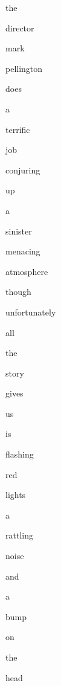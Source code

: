\documentclass[varwidth]{standalone}
\begin{document}
\begin{CJK*}{UTF8}{gbsn}
{\setlength{\fboxsep}{0pt}\colorbox{white!0}{\parbox{0.8\textwidth}{
\colorbox{red!6.2263393}{\strut the} \colorbox{red!10.334582}{\strut director} \colorbox{red!15.317906}{\strut mark} \colorbox{red!9.5696945}{\strut pellington} \colorbox{red!8.6223}{\strut does} \colorbox{red!9.663196}{\strut a} \colorbox{blue!26.770805}{\strut terrific} \colorbox{red!12.171555}{\strut job} \colorbox{red!13.468639}{\strut conjuring} \colorbox{red!4.5437455}{\strut up} \colorbox{red!2.2544625}{\strut a} \colorbox{red!7.7666454}{\strut sinister} \colorbox{red!8.245412}{\strut menacing} \colorbox{red!1.4016712}{\strut atmosphere} \colorbox{blue!3.835258}{\strut though} \colorbox{red!56.419003}{\strut unfortunately} \colorbox{red!11.357104}{\strut all} \colorbox{red!8.11032}{\strut the} \colorbox{red!2.7061648}{\strut story} \colorbox{red!1.1618927}{\strut gives} \colorbox{red!1.1866478}{\strut us} \colorbox{red!6.651921}{\strut is} \colorbox{red!3.8103228}{\strut flashing} \colorbox{red!7.5579667}{\strut red} \colorbox{red!3.975449}{\strut lights} \colorbox{red!19.46616}{\strut a} \colorbox{red!12.293593}{\strut rattling} \colorbox{red!3.4819107}{\strut noise} \colorbox{red!14.094279}{\strut and} \colorbox{red!23.225025}{\strut a} \colorbox{red!22.66697}{\strut bump} \colorbox{red!4.0177054}{\strut on} \colorbox{red!3.4850764}{\strut the} \colorbox{red!6.7588253}{\strut head} 
}}}
\end{CJK*}
\end{document}
